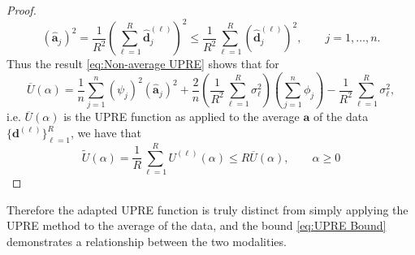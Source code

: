 \documentclass[12pt]{article}
\newcommand{\aVec}{\mathbf{a}}	%
\newcommand{\dVec}{\mathbf{d}}	%
\newcommand{\dft}[1]{\widehat{#1}}	%
\newcommand{\regparam}{\alpha}
\newcommand{\filt}{\phi}
\newcommand{\mfilt}{\psi}
\newcommand{\noiseSD}{\sigma}	%
\newcommand{\U}{U}	%
\begin{document}
\begin{proof}
\begin{equation}
\label{eq:Coefficients of Average}
\left(\dft{\aVec}_j\right)^2 = \frac{1}{R^2}\left(\sum_{\ell=1}^R \dft{\dVec}_j^{(\ell)}\right)^2 \leq \frac{1}{R^2} \sum_{\ell=1}^R \left(\dft{\dVec}_j^{(\ell)}\right)^2, \qquad j = 1,\ldots,n.
\end{equation}
Thus the result \eqref{eq:Non-average UPRE} shows that for
\[\overline{U}(\regparam) = \frac{1}{n}\sum_{j=1}^{n} \left(\mfilt_j\right)^2\left(\dft{\aVec}_j\right)^2 + \frac{2}{n} \left(\frac{1}{R^2} \sum_{\ell=1}^R \noiseSD_\ell^2\right) \left(\sum_{j=1}^{n} \filt_j\right) - \frac{1}{R^2} \sum_{\ell=1}^R\noiseSD_\ell^2,\]
i.e. $\overline{U}(\regparam)$ is the UPRE function as applied to the average $\aVec$ of the data $\{\dVec^{(\ell)}\}_{\ell=1}^R$, we have that
\[\widetilde{U}(\regparam) = \frac{1}{R} \sum_{\ell=1}^R \U^{(\ell)}(\regparam) \leq R \overline{U}(\regparam), \qquad \regparam \geq 0\]
\end{proof}
\noindent Therefore the adapted UPRE function is truly distinct from simply applying the UPRE method to the average of the data, and the bound \eqref{eq:UPRE Bound} demonstrates a relationship between the two modalities.
\end{document}
